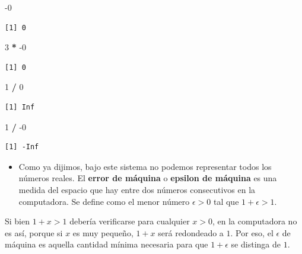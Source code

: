 \documentclass[openany]{book}
\newenvironment{Shaded}{\begin{snugshade}}{\end{snugshade}}
\newcommand{\DecValTok}[1]{\textcolor[rgb]{0.00,0.00,0.81}{#1}}
\newcommand{\OperatorTok}[1]{\textcolor[rgb]{0.81,0.36,0.00}{\textbf{#1}}}
\newcommand{\StringTok}[1]{\textcolor[rgb]{0.31,0.60,0.02}{#1}}
\providecommand{\tightlist}{%
  \setlength{\itemsep}{0pt}\setlength{\parskip}{0pt}}
\begin{document}
\begin{Shaded}
\begin{Highlighting}[]
\DecValTok{-0}
\end{Highlighting}
\end{Shaded}

\begin{verbatim}
[1] 0
\end{verbatim}

\begin{Shaded}
\begin{Highlighting}[]
\DecValTok{3} \OperatorTok{*}\StringTok{ }\DecValTok{-0}
\end{Highlighting}
\end{Shaded}

\begin{verbatim}
[1] 0
\end{verbatim}

\begin{Shaded}
\begin{Highlighting}[]
\DecValTok{1} \OperatorTok{/}\StringTok{ }\DecValTok{0}
\end{Highlighting}
\end{Shaded}

\begin{verbatim}
[1] Inf
\end{verbatim}

\begin{Shaded}
\begin{Highlighting}[]
\DecValTok{1} \OperatorTok{/}\StringTok{ }\DecValTok{-0}
\end{Highlighting}
\end{Shaded}

\begin{verbatim}
[1] -Inf
\end{verbatim}

\begin{itemize}
\tightlist
\item
  Como ya dijimos, bajo este sistema no podemos representar todos los números reales. El \textbf{error de máquina} o \textbf{epsilon de máquina} es una medida del espacio que hay entre dos números consecutivos en la computadora. Se define como el menor número \(\epsilon > 0\) tal que \(1 + \epsilon > 1\).
\end{itemize}

Si bien \(1 + x > 1\) debería verificarse para cualquier \(x > 0\), en la computadora no es así, porque si \(x\) es muy pequeño, \(1 + x\) será redondeado a \(1\). Por eso, el \(\epsilon\) de máquina es aquella cantidad mínima necesaria para que \(1 + \epsilon\) se distinga de \(1\).
\end{document}
